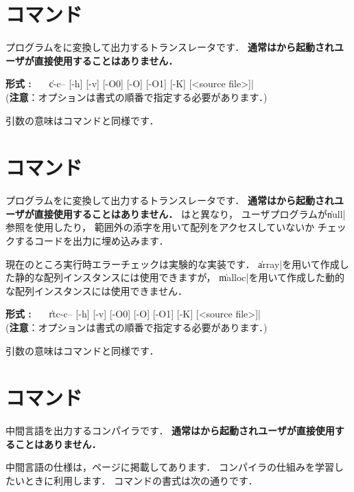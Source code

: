 \section{{\ccmmc}コマンド}
\label{command:ccmmc}

{\cmm}プログラムを{\cl}に変換して出力するトランスレータです．
{\bf 通常は{\cmc}から起動されユーザが直接使用することはありません．}

\begin{flushleft}
{\bf 形式 : }~~~\|c-c-- [-h] [-v] [-O0] [-O] [-O1] [-K] [<source file>]|\\
({\bf 注意}：オプションは書式の順番で指定する必要があります．)
\end{flushleft}

引数の意味は{\cmmc}コマンドと同様です．

\section{{\rtccmmc}コマンド}
\label{command:rtccmmc}

{\cmm}プログラムを{\cl}に変換して出力するトランスレータです．
{\bf 通常は{\cmc}から起動されユーザが直接使用することはありません．}
{\rtccmmc}は{\ccmmc}と異なり，
ユーザプログラムが\|null|参照を使用したり，
範囲外の添字を用いて配列をアクセスしていないか
チェックするコードを出力に埋め込みます．

現在のところ実行時エラーチェックは実験的な実装です．
\|array|を用いて作成した静的な配列インスタンスには使用できますが，
\|malloc|を用いて作成した動的な配列インスタンスには使用できません．

\begin{flushleft}
{\bf 形式 : }~~~\|rtc-c-- [-h] [-v] [-O0] [-O] [-O1] [-K] [<source file>]|\\
({\bf 注意}：オプションは書式の順番で指定する必要があります．)
\end{flushleft}

引数の意味は{\cmmc}コマンドと同様です．

\section{{\icmmc}コマンド}
\label{command:icmmc}

中間言語を出力する{\cmm}コンパイラです．
{\bf 通常は{\cmi}から起動されユーザが直接使用することはありません．}

中間言語の仕様は，\pageref{app:vm}ページに掲載してあります．
コンパイラの仕組みを学習したいときに利用します．
{\icmmc}コマンドの書式は次の通りです．

